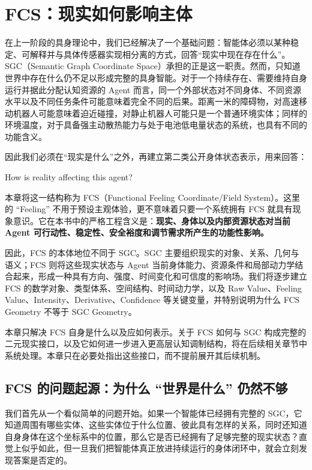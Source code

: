 \chapter{FCS：现实如何影响主体}

\begin{chapterlead}
在上一阶段的具身理论中，我们已经解决了一个基础问题：智能体必须以某种稳定、可解释并与具体传感器实现相分离的方式，回答“现实中现在存在什么”。SGC（Semantic Graph Coordinate Space）承担的正是这一职责。然而，只知道世界中存在什么仍不足以形成完整的具身智能。对于一个持续存在、需要维持自身运行并据此分配认知资源的 Agent 而言，同一个外部状态对不同身体、不同资源水平以及不同任务条件可能意味着完全不同的后果。距离一米的障碍物，对高速移动机器人可能意味着迫近碰撞，对静止机器人可能只是一个普通环境实体；同样的环境温度，对于具备强主动散热能力与处于电池低电量状态的系统，也具有不同的功能含义。

因此我们必须在“现实是什么”之外，再建立第二类公开身体状态表示，用来回答：

\begin{statementbox}
How is reality affecting this agent?
\end{statementbox}

本章将这一结构称为 FCS（Functional Feeling Coordinate/Field System）。这里的 ``Feeling'' 不用于预设主观体验，更不意味着只要一个系统拥有 FCS 就具有现象意识。它在本书中的严格工程含义是：\textbf{现实、身体以及内部资源状态对当前 Agent 可行动性、稳定性、安全裕度和调节需求所产生的功能性影响。}

因此，FCS 的本体地位不同于 SGC。SGC 主要组织现实的对象、关系、几何与语义；FCS 则将这些现实状态与 Agent 当前身体能力、资源条件和局部动力学结合起来，形成一种具有方向、强度、时间变化和可信度的影响场。我们将逐步建立 FCS 的数学对象、类型体系、空间结构、时间动力学，以及 Raw Value、Feeling Value、Intensity、Derivative、Confidence 等关键变量，并特别说明为什么 FCS Geometry 不等于 SGC Geometry。

本章只解决 FCS 自身是什么以及应如何表示。关于 FCS 如何与 SGC 构成完整的二元现实接口，以及它如何进一步进入更高层认知调制结构，将在后续相关章节中系统处理。本章只在必要处指出这些接口，而不提前展开其后续机制。
\end{chapterlead}

\section{FCS 的问题起源：为什么 ``世界是什么'' 仍然不够}

我们首先从一个看似简单的问题开始。如果一个智能体已经拥有完整的 SGC，它知道周围有哪些实体、这些实体位于什么位置、彼此具有怎样的关系，同时还知道自身身体在这个坐标系中的位置，那么它是否已经拥有了足够完整的现实状态？直觉上似乎如此，但一旦我们把智能体真正放进持续运行的身体闭环中，就会立刻发现答案是否定的。


